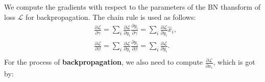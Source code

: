 \documentclass[10pt,onecolumn]{book}
\begin{document}
We compute the gradients with respect to the parameters of the BN thansform of loss $\mathcal{L}$ for backpropagation. The chain rule is used as follows:
\begin{equation}
\begin{split}
& \frac{\partial \mathcal{L}}{\partial \gamma} = \sum_i \frac{\partial \mathcal{L}}{\partial y_i}  \frac{\partial y_i}{\partial \gamma} = \sum_i \frac{\partial \mathcal{L}}{\partial y_i} \hat{x}_i, \\
& \frac{\partial \mathcal{L}}{\partial \beta} = \sum_i \frac{\partial \mathcal{L}}{\partial y_i}  \frac{\partial y_i}{\partial \beta} = \sum_i \frac{\partial \mathcal{L}}{\partial y_i}. \\
\end{split}
\end{equation}
For the process of \textbf{backpropagation}, we also need to compute $\frac{\partial \mathcal{L}}{\partial x_i}$, which is got by:
\end{document}
